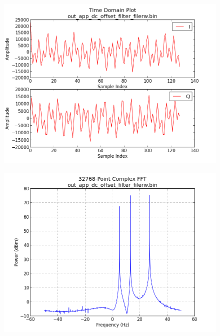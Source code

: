 \documentclass{article}
\begin{document}
	\begin{figure}[ht]
		\centering
		\begin{minipage}{.5\textwidth}
			\centering\includegraphics[width=1.0\linewidth]{output_time_tones}
			\label{fig:out_time_tone}
		\end{minipage}%
		\begin{minipage}{.5\textwidth}
			\centering\includegraphics[width=1.0\linewidth]{output_freq_tones}
			\label{fig:out_freq_tone}
		\end{minipage}
	\end{figure}
	\newpage
\end{document}
